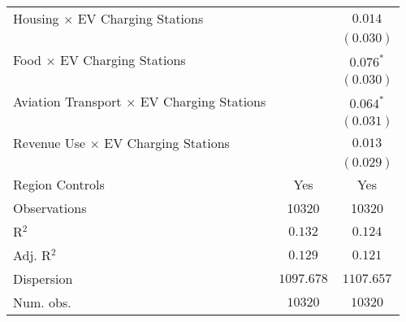 \begin{center}
\begin{tiny}
\begin{longtable}{l@{} c@{} c@{}}
\quad Housing $\times$ EV Charging Stations            &                  & $0.014$          \\
                                                       &                  & $(0.030)$        \\
\quad Food $\times$ EV Charging Stations               &                  & $0.076^{*}$      \\
                                                       &                  & $(0.030)$        \\
\quad Aviation Transport $\times$ EV Charging Stations &                  & $0.064^{*}$      \\
                                                       &                  & $(0.031)$        \\
\quad Revenue Use $\times$ EV Charging Stations        &                  & $0.013$          \\
                                                       &                  & $(0.029)$        \\
\hline
Region Controls                                        & Yes              & Yes              \\
Observations                                           & 10320            & 10320            \\
R$^2$                                                  & $0.132$          & $0.124$          \\
Adj. R$^2$                                             & $0.129$          & $0.121$          \\
Dispersion                                             & $1097.678$       & $1107.657$       \\
Num. obs.                                              & $10320$          & $10320$          \\
\end{longtable}
\end{tiny}
\end{center}
